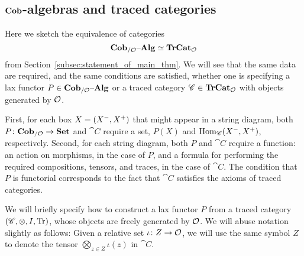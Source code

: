 \documentclass[11pt,oneside,article]{memoir}
\begin{document}
\subsection{$\mathbf{Cob}$-algebras and traced categories}\label{subsec:cobalg_and_trCat}

Here we sketch the equivalence of categories 
$$\mathbf{Cob}_{/\mathcal{O}}{\text \textendash}\mathbf{Alg}\simeq\mathbf{TrCat}_{\mathcal{O}}$$
from Section~\ref{subsec:statement_of_main_thm}. We will see that the same data are required, and the same conditions are
satisfied, whether one is specifying a lax functor $P\in\mathbf{Cob}_{/\mathcal{O}}{\text \textendash}\mathbf{Alg}$ or a traced category
$\mathscr{C}\in\mathbf{TrCat}_{\mathcal{O}}$ with objects generated by $\mathcal{O}$. 

First, for each box $X=(X^-,X^+)$ that might appear in a string diagram, both $P\colon\mathbf{Cob}_{/\mathcal{O}}\to\mathbf{Set}$ and
$\cat{C}$ require a set, $P(X)$ and $\operatorname{Hom}_{\mathscr{C}}(X^-,X^+)$, respectively.
Second, for each string diagram, both $P$ and $\cat{C}$ require a function: an action on morphisms,
in the case of $P$, and a formula for performing the required compositions, tensors, and traces, in
the case of $\cat{C}$. The condition that $P$ is functorial corresponds to the fact that $\cat{C}$
satisfies the axioms of traced categories. 

We will briefly specify how to construct a lax functor $P$ from a traced category $(\mathscr{C},\otimes,I,\operatorname{Tr})$, whose objects are freely generated by $\mathcal{O}$. We will abuse notation slightly as follows: Given a relative set
$\iota\colon Z\to\mathcal{O}$, we will use the same symbol $Z$ to denote
the tensor $\bigotimes_{z\in Z}\iota(z)$ in $\cat{C}$. 
\end{document}
